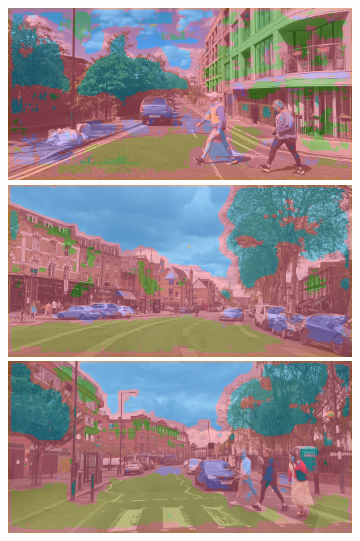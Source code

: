 \begin{figure}[H]
\begin{subfigure}[t]{.32\textwidth}
		\includegraphics[width=\textwidth]{city_images/HackneyScapes/Hackney3173_unet.png} \\[5pt]
		\includegraphics[width=\textwidth]{city_images/HackneyScapes/Hackney3204_unet.png} \\[5pt]
		\includegraphics[width=\textwidth]{city_images/HackneyScapes/Hackney3210_unet.png}


\end{subfigure}
\end{figure}

